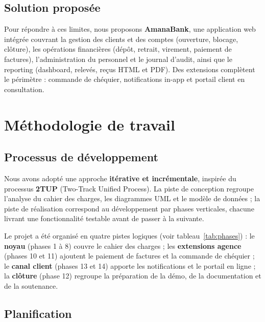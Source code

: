 \documentclass[11pt,a4paper,oneside]{report}
\newcommand{\nomapplication}{AmanaBank}
\begin{document}
\subsection{Solution proposée}

Pour répondre à ces limites, nous proposons \textbf{\nomapplication}, une application web intégrée couvrant la gestion des clients et des comptes (ouverture, blocage, clôture), les opérations financières (dépôt, retrait, virement, paiement de factures), l'administration du personnel et le journal d'audit, ainsi que le reporting (dashboard, relevés, reçus HTML et PDF). Des extensions complètent le périmètre : commande de chéquier, notifications in-app et portail client en consultation.

\section{Méthodologie de travail}

\subsection{Processus de développement}

Nous avons adopté une approche \textbf{itérative et incrémentale}, inspirée du processus \textbf{2TUP} (Two-Track Unified Process). La piste de conception regroupe l'analyse du cahier des charges, les diagrammes UML et le modèle de données ; la piste de réalisation correspond au développement par phases verticales, chacune livrant une fonctionnalité testable avant de passer à la suivante.

Le projet a été organisé en quatre pistes logiques (voir tableau~\ref{tab:phases}) : le \textbf{noyau} (phases 1 à 8) couvre le cahier des charges ; les \textbf{extensions agence} (phases 10 et 11) ajoutent le paiement de factures et la commande de chéquier ; le \textbf{canal client} (phases 13 et 14) apporte les notifications et le portail en ligne ; la \textbf{clôture} (phase 12) regroupe la préparation de la démo, de la documentation et de la soutenance.

\subsection{Planification}
\end{document}
